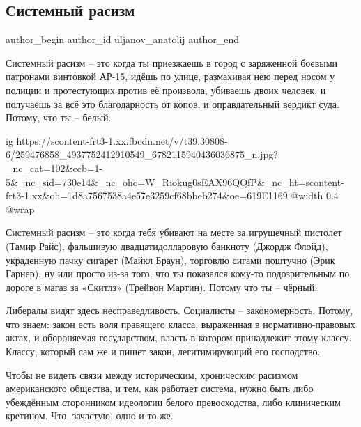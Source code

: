  
 
 
 
 
 
\subsection{Системный расизм}
\label{sec:20_11_2021.fb.uljanov_anatolij.1.sistemnyj_racizm}
 
\ifcmt
 author_begin
   author_id uljanov_anatolij
 author_end
\fi

Системный расизм – это когда ты приезжаешь в город с заряженной боевыми
патронами винтовкой АР-15, идёшь по улице, размахивая нею перед носом у полиции
и протестующих против её произвола, убиваешь двоих человек, и получаешь за всё
это благодарность от копов, и оправдательный вердикт суда. Потому, что ты –
белый.

\ifcmt
  ig https://scontent-frt3-1.xx.fbcdn.net/v/t39.30808-6/259476858_4937752412910549_6782115940436036875_n.jpg?_nc_cat=102&ccb=1-5&_nc_sid=730e14&_nc_ohc=W_Riokug0sEAX96QQfP&_nc_ht=scontent-frt3-1.xx&oh=1d8a7567538a4e57e3259cf68bbeb274&oe=619E1169
  @width 0.4
  @wrap 
\fi

Системный расизм – это когда тебя убивают на месте за игрушечный пистолет
(Тамир Райс), фальшивую двадцатидолларовую банкноту (Джордж Флойд), украденную
пачку сигарет (Майкл Браун), торговлю сигами поштучно (Эрик Гарнер), ну или
просто из-за того, что ты показался кому-то подозрительным по дороге в магаз за
«Скитлз» (Трейвон Мартин). Потому что ты – чёрный.

Либералы видят здесь несправедливость. Социалисты – закономерность. Потому, что
знаем: закон есть воля правящего класса, выраженная в нормативно-правовых
актах, и обороняемая государством, власть в котором принадлежит этому классу.
Классу, который сам же и пишет закон, легитимирующий его господство.

Чтобы не видеть связи между историческим, хроническим расизмом американского
общества, и тем, как работает система, нужно быть либо убеждённым сторонником
идеологии белого превосходства, либо клиническим кретином. Что, зачастую, одно
и то же.
